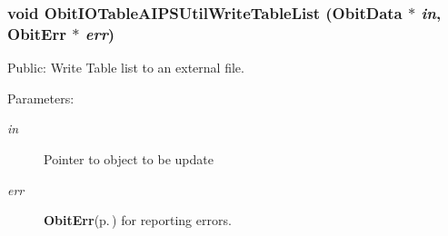 \subsubsection{\setlength{\rightskip}{0pt plus 5cm}void Obit\-IOTable\-AIPSUtil\-Write\-Table\-List ({\bf Obit\-Data} $\ast$ {\em in}, {\bf Obit\-Err} $\ast$ {\em err})}\label{ObitIOTableAIPSUtil_8c_a1}


Public: Write Table list to an external file. 

\begin{Desc}
\item[Parameters:]
\begin{description}
\item[{\em in}]Pointer to object to be update \item[{\em err}]{\bf Obit\-Err}{\rm (p.\,\pageref{structObitErr})} for reporting errors. \end{description}
\end{Desc}
